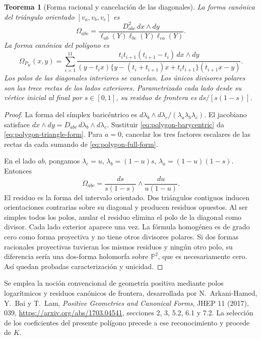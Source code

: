 \documentclass[a4paper,10pt]{article}
\newtheorem{theorem}{Teorema}[section]
\theoremstyle{definition}\newtheorem{definition}[theorem]{Definición}
\theoremstyle{remark}\newtheorem{remark}[theorem]{Observación}
\numberwithin{equation}{section}
\begin{document}
\begin{theorem}[Forma racional y cancelación de las diagonales]
\label{thm:polygon-form}
La forma canónica del triángulo orientado \([v_a,v_b,v_c]\) es
\begin{equation}
 \Omega_{abc}=
 \frac{D_{abc}^2\,dx\wedge dy}
 {\ell_{ab}(Y)\ell_{bc}(Y)\ell_{ca}(Y)}.
 \label{eq:polygon-triangle-form}
\end{equation}
La forma canónica del polígono es
\begin{equation}
 \boxed{\displaystyle
 \Omega_{P_K}(x,y)=
 \sum_{i=1}^{11}
 \frac{t_it_{i+1}(t_{i+1}-t_i)\,dx\wedge dy}
 {(y-t_ix)\{y-(t_i+t_{i+1})x+t_it_{i+1}\}(t_{i+1}x-y)}.}
 \label{eq:polygon-full-form}
\end{equation}
Los polos de las diagonales interiores se cancelan. Los únicos divisores
polares son las trece rectas de los lados exteriores. Parametrizado cada
lado desde su vértice inicial al final por \(s\in[0,1]\), su residuo de
frontera es \(ds/[s(1-s)]\).
\end{theorem}
\begin{proof}
La forma del símplex baricéntrico es
\(d\lambda_b\wedge d\lambda_c/(\lambda_a\lambda_b\lambda_c)\).
El jacobiano satisface
\(dx\wedge dy=D_{abc}\,d\lambda_b\wedge d\lambda_c\).
Sustituir \eqref{eq:polygon-barycentric} da
\eqref{eq:polygon-triangle-form}. Para \(a=0\), cancelar los tres factores
escalares de las rectas da cada sumando de \eqref{eq:polygon-full-form}.

En el lado \(ab\), pongamos \(\lambda_c=u\),
\(\lambda_b=(1-u)s\), \(\lambda_a=(1-u)(1-s)\). Entonces
\[
 \Omega_{abc}=\frac{ds}{s(1-s)}\wedge\frac{du}{u(1-u)}.
\]
El residuo es la forma del intervalo orientado. Dos triángulos contiguos
inducen orientaciones contrarias sobre su diagonal y producen residuos
opuestos. Al ser simples todos los polos, anular el residuo elimina el
polo de la diagonal como divisor. Cada lado exterior aparece una vez.
La fórmula homogénea es de grado cero como forma proyectiva y no tiene
otros divisores polares. Si dos formas racionales proyectivas tuvieran los
mismos residuos y ningún otro polo, su diferencia sería una dos-forma
holomorfa sobre \(\mathbb P^2\), que es necesariamente cero. Así quedan
probadas caracterización y unicidad.
\end{proof}

Se emplea la noción convencional de geometría positiva mediante polos
logarítmicos y residuos canónicos de frontera, desarrollada por
N.~Arkani-Hamed, Y.~Bai y T.~Lam, \emph{Positive Geometries and Canonical
Forms}, JHEP 11 (2017), 039,
\url{https://arxiv.org/abs/1703.04541}, secciones 2, 3, 5.2, 6.1 y 7.2.
La selección de los coeficientes del presente polígono precede a ese
reconocimiento y procede de \(K\).
\end{document}
